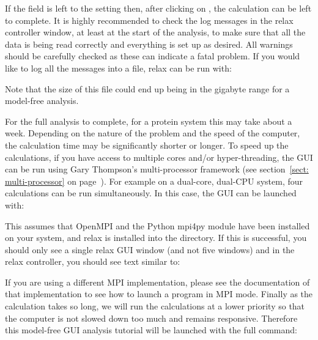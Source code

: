 \begin{htmlonly}
\begin{htmlonly}
If the  field is left to the  setting then, after clicking on , the calculation can be left to complete.  It is highly recommended to check the log messages in the relax controller window, at least at the start of the analysis, to make sure that all the data is being read correctly and everything is set up as desired.  All warnings should be carefully checked as these can indicate a fatal problem.  If you would like to log all the messages into a file, relax can be run with:


Note that the size of this  file could end up being in the gigabyte range for a model-free analysis.

For the full analysis to complete, for a protein system this may take about a week.  Depending on the nature of the problem and the speed of the computer, the calculation time may be significantly shorter or longer.  To speed up the calculations, if you have access to multiple cores and/or hyper-threading, the GUI can be run using Gary Thompson's multi-processor framework (see section~\ref{sect: multi-processor} on page~\pageref{sect: multi-processor}).  For example on a dual-core, dual-CPU system, four calculations can be run simultaneously.  In this case, the GUI can be launched with:


This assumes that OpenMPI and the Python mpi4py module have been installed on your system, and relax is installed into the  directory.  If this is successful, you should only see a single relax GUI window (and not five windows) and in the relax controller, you should see text similar to:


If you are using a different MPI implementation, please see the documentation of that implementation to see how to launch a program in MPI mode.  Finally as the calculation takes so long, we will run the calculations at a lower priority so that the computer is not slowed down too much and remains responsive.  Therefore this model-free GUI analysis tutorial will be launched with the full command:




\end{htmlonly}
\end{htmlonly}
